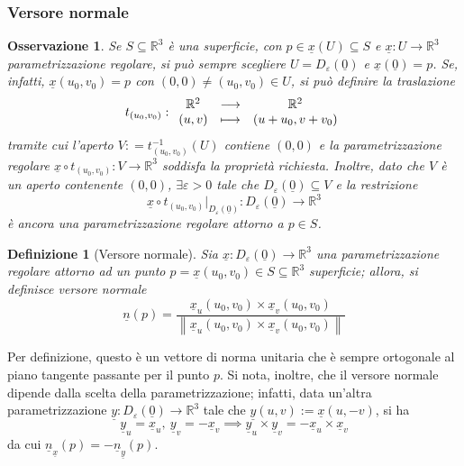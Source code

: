 \documentclass[12pt]{scrartcl}
\theoremstyle{style}
\newtheorem{definizione}{Definizione}[section]
\newtheorem{osservazione}{Osservazione}[section]
\numberwithin{equation}{subsection}
\begin{document}
\subsubsection{Versore normale}
\begin{osservazione}
Se $S \subseteq \mathbb{R}^3$ \`e una superficie, con $p \in \underline{x}(U) \subseteq S$ e $\underline{x}: U \to \mathbb{R}^3$ parametrizzazione regolare, si pu\`o sempre scegliere $U = D_\varepsilon (\underline{0})$ e $\underline{x}(\underline{0}) = p $.
Se, infatti, $\underline{x}(u_0,v_0) = p$ con $(0,0)\neq (u_0,v_0) \in U$, si pu\`o definire la traslazione
\[
t_{(u_0,v_0)} :
\begin{array}
	{c c c}
	\mathbb{R}^2 & \longrightarrow & \mathbb{R}^2\\
	(u,v) & \longmapsto & (u+u_0, v + v_0)
\end{array}
\] 
tramite cui l'aperto $V: = t _{(u_0,v_{0})} ^{-1}(U)$ contiene $(0,0)$ e la parametrizzazione regolare $\underline{x}\circ t_{(u_0,v_0)} :V \to \mathbb{R}^3$ soddisfa la propriet\`a richiesta.
Inoltre, dato che $V$ \`e un aperto contenente $(0,0)$, $\exists \varepsilon >0$ tale che $D_\varepsilon (\underline{0}) \subseteq V$ e la restrizione
\[
\underline{x}\circ t_{(u_0,v_0)} |_{D_\varepsilon (\underline{0})} : D_\varepsilon (\underline{0}) \longrightarrow \mathbb{R}^3
\] 
\`e ancora una parametrizzazione regolare attorno a $p \in S$.
\end{osservazione}
\begin{definizione}
	[Versore normale]
	Sia $\underline{x}:D_\varepsilon(\underline{0})\to \mathbb{R}^3$ una parametrizzazione regolare attorno ad un punto $p = \underline{x}(u_0,v_0) \in S \subseteq \mathbb{R}^3$ superficie; allora, si definisce \textit{versore normale} 
	\[
	\underline{n}(p) = \frac{\underline{x}_u (u_0,v_0) \times \underline{x}_v (u_0,v_0)}{\left\lVert \underline{x}_u (u_0,v_0) \times \underline{x}_v (u_0,v_0) \right\rVert }
	\] 
\end{definizione}
\noindent Per definizione, questo \`e un vettore di norma unitaria che \`e sempre ortogonale al piano tangente passante per il punto $p$.
Si nota, inoltre, che il versore normale dipende dalla scelta della parametrizzazione; infatti, data un'altra parametrizzazione $\underline{y}:D_\varepsilon (\underline{0}) \to \mathbb{R}^3$ tale che $\underline{y}(u,v) := \underline{x}(u,-v)$, si ha
\[
	 \underline{y}_u = \underline{x}_u, \ \underline{y}_v = - \underline{x}_v \implies \underline{y}_u \times \underline{y}_v = - \underline{x}_u \times \underline{x}_v
\] 
da cui $\underline{n}_{\underline{x}}(p) = - \underline{n}_{\underline{y}}(p) $.
\end{document}
